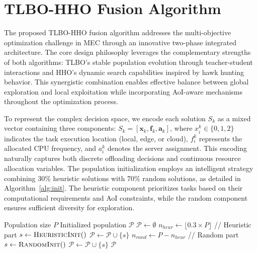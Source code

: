 \documentclass[conference]{IEEEtran}
\begin{document}
\section{TLBO-HHO Fusion Algorithm}

The proposed TLBO-HHO fusion algorithm addresses the multi-objective optimization challenge in MEC through an innovative two-phase integrated architecture. The core design philosophy leverages the complementary strengths of both algorithms: TLBO's stable population evolution through teacher-student interactions and HHO's dynamic search capabilities inspired by hawk hunting behavior. This synergistic combination enables effective balance between global exploration and local exploitation while incorporating AoI-aware mechanisms throughout the optimization process.

To represent the complex decision space, we encode each solution $S_k$ as a mixed vector containing three components: $S_k = [\mathbf{x}_k, \mathbf{f}_k, \mathbf{a}_k]$, where $x_i^k \in \{0, 1, 2\}$ indicates the task execution location (local, edge, or cloud), $f_i^k$ represents the allocated CPU frequency, and $a_i^k$ denotes the server assignment. This encoding naturally captures both discrete offloading decisions and continuous resource allocation variables. The population initialization employs an intelligent strategy combining 30\% heuristic solutions with 70\% random solutions, as detailed in Algorithm~\ref{alg:init}. The heuristic component prioritizes tasks based on their computational requirements and AoI constraints, while the random component ensures sufficient diversity for exploration.

\begin{algorithm}[!t]
  \small
  \caption{Intelligent Initialization Strategy}
  \label{alg:init}
  \begin{algorithmic}[1]
    \REQUIRE Population size $P$
    \ENSURE Initialized population $\mathcal{P}$
    \STATE $\mathcal{P} \leftarrow \emptyset$
    \STATE $n_{heur} \leftarrow \lfloor 0.3 \times P \rfloor$ // Heuristic part
        \STATE $s \leftarrow \textsc{HeuristicInit}()$
        \STATE $\mathcal{P} \leftarrow \mathcal{P} \cup \{s\}$
    \ENDFOR
    \STATE $n_{rand} \leftarrow P - n_{heur}$ // Random part
        \STATE $s \leftarrow \textsc{RandomInit}()$
        \STATE $\mathcal{P} \leftarrow \mathcal{P} \cup \{s\}$
    \ENDFOR
    \RETURN $\mathcal{P}$
  \end{algorithmic}
\end{algorithm}
\end{document}
